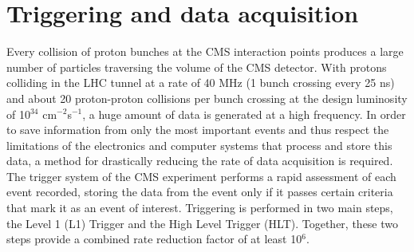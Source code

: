 \section{Triggering and data acquisition\label{sec:cms-triggerdaq}}
Every collision of proton bunches at the CMS interaction points produces a large number of particles traversing the volume of the CMS detector. With protons colliding in the LHC tunnel at a rate of 40 MHz (1 bunch crossing every 25 ns) and about 20 proton-proton collisions per bunch crossing at the design luminosity of 10$^{34}$ cm$^{-2}$s$^{-1}$, a huge amount of data is generated at a high frequency. In order to save information from only the most important events and thus respect the limitations of the electronics and computer systems that process and store this data, a method for drastically reducing the rate of data acquisition is required. The trigger system of the CMS experiment performs a rapid assessment of each event recorded, storing the data from the event only if it passes certain criteria that mark it as an event of interest. Triggering is performed in two main steps, the Level 1 (L1) Trigger and the High Level Trigger (HLT). Together, these two steps provide a combined rate reduction factor of at least 10$^6$.

